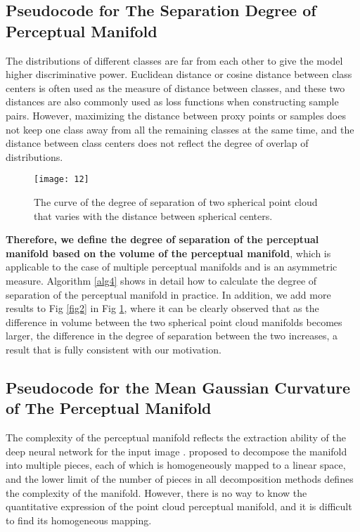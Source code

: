 \documentclass[10pt,twocolumn,letterpaper]{article}
\begin{document}
\subsection*{Pseudocode for The Separation Degree of Perceptual Manifold}
The distributions of different classes are far from each other to give the model higher discriminative power. Euclidean distance or cosine distance between class centers is often used as the measure of distance between classes, and these two distances are also commonly used as loss functions when constructing sample pairs. However, maximizing the distance between proxy points or samples does not keep one class away from all the remaining classes at the same time, and the distance between class centers does not reflect the degree of overlap of distributions.
\begin{figure}[h]
\centering
\centerline{\texttt{[image: 12]}}
\vskip -0.08in
\caption{The curve of the degree of separation of two spherical point cloud that varies with the distance between spherical centers.}
\label{fig9}
\end{figure}
\textbf{Therefore, we define the degree of separation of the perceptual manifold based on the volume of the perceptual manifold}, which is applicable to the case of multiple perceptual manifolds and is an asymmetric measure. Algorithm \ref{alg4} shows in detail how to calculate the degree of separation of the perceptual manifold in practice. In addition, we add more results to Fig \ref{fig2} in Fig \ref{fig9}, where it can be clearly observed that as the difference in volume between the two spherical point cloud manifolds becomes larger, the difference in the degree of separation between the two increases, a result that is fully consistent with our motivation.




\subsection*{Pseudocode for the Mean Gaussian Curvature of The Perceptual Manifold}
The complexity of the perceptual manifold reflects the extraction ability of the deep neural network for the input image \cite{paper51}. \cite{paper49} proposed to decompose the manifold into multiple pieces, each of which is homogeneously mapped to a linear space, and the lower limit of the number of pieces in all decomposition methods defines the complexity of the manifold. However, there is no way to know the quantitative expression of the point cloud perceptual manifold, and it is difficult to find its homogeneous mapping. 
\end{document}
